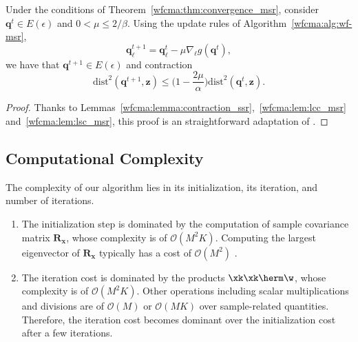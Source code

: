 \begin{lem} \label{wfcma:lemma:contraction_msr}
Under the conditions of Theorem~\ref{wfcma:thm:convergence_msr}, consider $\bm{q}^t\in E(\epsilon)$ and $0 < \mu \leq 2/\beta$. Using the update rules of Algorithm~\ref{wfcma:alg:wf-msr},
\begin{equation}
	\bm{q}_{\ell}^{t+1} = \bm{q}_{\ell}^t - \mu\nabla_{\ell} g(\bm{q}^t ),
\end{equation}
we have that $\bm{q}^{t+1}\in E(\epsilon)$ and contraction
\begin{equation}
	\mathrm{dist}^2	(\bm{q}^{t+1} ,\bm{z}) \leq \Big(1 -\frac{2\mu}{\alpha}\Big) \mathrm{dist}^2	(\bm{q}^t,\bm{z}). \label{wfcma:eqn:contraction_msr}
\end{equation}
\end{lem} 
\begin{proof}
	Thanks to Lemmas~\ref{wfcma:lemma:contraction_ssr},~\ref{wfcma:lem:lcc_msr} and~\ref{wfcma:lem:lsc_msr}, this proof is an straightforward adaptation of \cite[Lemma 7.10]{Candes2015a_phaseretrievalWF}.
\end{proof}

\subsection{Computational Complexity}
The complexity of our algorithm lies in its initialization, its iteration, and number of iterations. 
\begin{enumerate}
\item The initialization step is dominated by the computation of sample covariance matrix $\bm{R}_{\bm{x}}$, whose complexity is of
$\mathcal{O}(M^2 K)$. Computing the largest eigenvector of $\bm{R}_{\bm{x}}$ typically has a cost of $\mathcal{O}(M^2)$ \cite{Candes2015a_phaseretrievalWF}.
\item The iteration cost is dominated by the products $\xk\xk\herm\w$, whose complexity is of $\mathcal{O}(M^2 K)$. 
Other operations including scalar multiplications and divisions are of
$\mathcal{O}(M)$ or $\mathcal{O}(MK)$ over 
sample-related quantities. Therefore, the iteration cost becomes dominant
over the initialization cost after a few iterations.
\end{enumerate}

